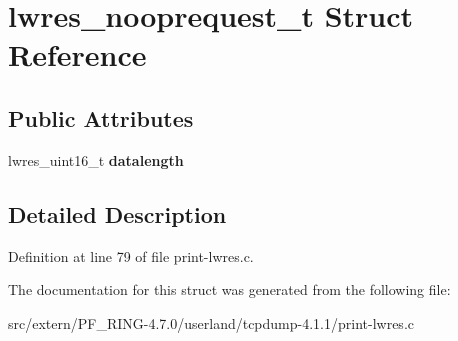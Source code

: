 \hypertarget{structlwres__nooprequest__t}{
\section{lwres\_\-nooprequest\_\-t Struct Reference}
\label{structlwres__nooprequest__t}
}
\subsection*{Public Attributes}
\begin{DoxyCompactItemize}
\item 
\hypertarget{structlwres__nooprequest__t_a6d2ea247d4961b6cfdbf33ddedbffca0}{
lwres\_\-uint16\_\-t {\bfseries datalength}}
\label{structlwres__nooprequest__t_a6d2ea247d4961b6cfdbf33ddedbffca0}

\end{DoxyCompactItemize}


\subsection{Detailed Description}


Definition at line 79 of file print-\/lwres.c.



The documentation for this struct was generated from the following file:\begin{DoxyCompactItemize}
\item 
src/extern/PF\_\-RING-\/4.7.0/userland/tcpdump-\/4.1.1/print-\/lwres.c\end{DoxyCompactItemize}
